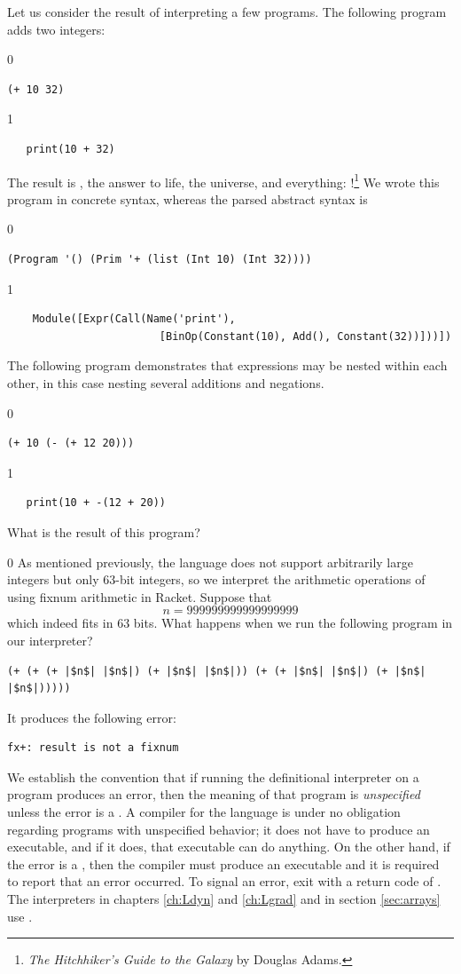 \documentclass[7x10]{TimesAPriori_MIT}%
\def\racketEd{0}
\def\pythonEd{1}
\def\edition{1}
\newcommand{\pythonColor}[0]{}
\numberwithin{theorem}{chapter}
\numberwithin{definition}{chapter}
\numberwithin{equation}{chapter}
\begin{document}
Let us consider the result of interpreting a few \LangInt{} programs. The
following program adds two integers:
{\if\edition\racketEd
\begin{lstlisting}
(+ 10 32)
\end{lstlisting}
\fi}
{\if\edition\pythonEd\pythonColor
\begin{lstlisting}
   print(10 + 32)
\end{lstlisting}
\fi}
%
\noindent The result is , the answer to life, the universe,
and everything: !\footnote{\emph{The Hitchhiker's Guide to
    the Galaxy} by Douglas Adams.}
%
We wrote this program in concrete syntax, whereas the parsed
abstract syntax is
{\if\edition\racketEd
\begin{lstlisting}
(Program '() (Prim '+ (list (Int 10) (Int 32))))
\end{lstlisting}
\fi}
{\if\edition\pythonEd\pythonColor
\begin{lstlisting}
    Module([Expr(Call(Name('print'),
                        [BinOp(Constant(10), Add(), Constant(32))]))])        
\end{lstlisting}
\fi}
The following program demonstrates that expressions may be nested within
each other, in this case nesting several additions and negations.
{\if\edition\racketEd
\begin{lstlisting}
(+ 10 (- (+ 12 20)))
\end{lstlisting}
\fi}
{\if\edition\pythonEd\pythonColor
\begin{lstlisting}
   print(10 + -(12 + 20))
\end{lstlisting}
\fi}
%
\noindent What is the result of this program?

{\if\edition\racketEd
As mentioned previously, the \LangInt{} language does not support
arbitrarily large integers but only $63$-bit integers, so we
interpret the arithmetic operations of \LangInt{} using fixnum arithmetic
in Racket.
Suppose that
\[
  n = 999999999999999999
\]
which indeed fits in $63$ bits.  What happens when we run the
following program in our interpreter?
\begin{lstlisting}
(+ (+ (+ |$n$| |$n$|) (+ |$n$| |$n$|)) (+ (+ |$n$| |$n$|) (+ |$n$| |$n$|)))))
\end{lstlisting}
It produces the following error:
\begin{lstlisting}
fx+: result is not a fixnum
\end{lstlisting}
We establish the convention that if running the definitional
interpreter on a program produces an error, then the meaning of that
program is \emph{unspecified} unless the
error is a . A compiler for the language is under
no obligation regarding programs with unspecified behavior; it does
not have to produce an executable, and if it does, that executable can
do anything.  On the other hand, if the error is a
, then the compiler must produce an executable and
it is required to report that an error occurred. To signal an error,
exit with a return code of .  The interpreters in chapters
\ref{ch:Ldyn} and \ref{ch:Lgrad} and in section \ref{sec:arrays} use
.
\fi}
\end{document}
